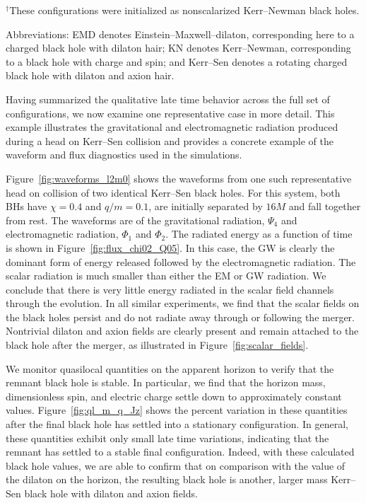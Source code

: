 \begin{table}[p]
\vspace{0.5em}

\begin{minipage}{\textwidth}
\footnotesize
$^{\dagger}$These configurations were initialized as nonscalarized
Kerr--Newman black holes.

\medskip

\noindent
Abbreviations: EMD denotes Einstein--Maxwell--dilaton, corresponding here to
a charged black hole with dilaton hair; KN denotes Kerr--Newman, corresponding
to a black hole with charge and spin; and Kerr--Sen denotes a rotating charged
black hole with dilaton and axion hair.
\end{minipage}

\endgroup
\end{table}
\FloatBarrier

Having summarized the qualitative late time behavior across the full set of configurations, we now examine one representative case in more detail. This example illustrates the gravitational and electromagnetic radiation produced during a head on Kerr--Sen collision and provides a concrete example of the waveform and flux diagnostics used in the simulations.

Figure~\ref{fig:waveforms_l2m0} shows the waveforms from one such representative head on collision of two identical Kerr--Sen black holes.  For this system, both BHs have $\chi = 0.4$ and $q/m = 0.1$, are initially separated by $16M$ and fall together from rest. 
The waveforms are of the gravitational radiation, $\Psi_4$ and electromagnetic radiation, $\Phi_1$ and $\Phi_2$.  
The radiated energy as a function of time is shown in Figure~\ref{fig:flux_chi02_Q05}.  
In this case, the GW is clearly the dominant form of energy released followed by the electromagnetic radiation. The scalar radiation is much smaller than either the EM or GW radiation. We conclude that there is very little energy radiated in the scalar field channels through the evolution.  In all similar experiments, we find that the scalar fields on the black holes persist and do not  radiate away through or following the merger.  Nontrivial dilaton and axion fields are clearly present and remain attached to the black hole after the merger, as illustrated in Figure~\ref{fig:scalar_fields}.

We monitor quasilocal quantities on the apparent horizon to verify that the remnant black hole is stable.  In particular, we find that the horizon mass, dimensionless spin, and electric charge settle down to approximately constant values.  Figure~\ref{fig:ql_m_q_Jz} shows the percent variation in these quantities after the final black hole has settled into a stationary configuration.  In general, these quantities exhibit only small
late time variations, indicating that the remnant has settled to a stable
final configuration. Indeed, with these calculated black hole values, we are able to confirm that on comparison with the value of the dilaton on the horizon, the resulting black hole is another, larger mass Kerr--Sen black hole with dilaton and axion fields.  


